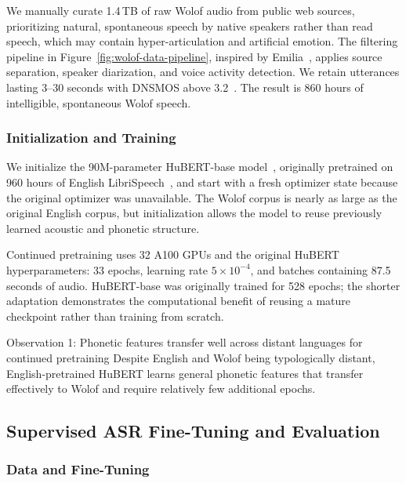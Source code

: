 We manually curate 1.4\,TB of raw Wolof audio from public web sources, prioritizing natural, spontaneous speech by native speakers rather than read speech, which may contain hyper-articulation and artificial emotion. The filtering pipeline in Figure~\ref{fig:wolof-data-pipeline}, inspired by Emilia~\citep{emilia,emilialarge,amphion}, applies source separation, speaker diarization, and voice activity detection. We retain utterances lasting 3--30 seconds with DNSMOS above 3.2~\citep{dnsmos}. The result is 860 hours of intelligible, spontaneous Wolof speech.

\subsubsection{Initialization and Training}

We initialize the 90M-parameter HuBERT-base model~\citep{hubert}, originally pretrained on 960 hours of English LibriSpeech~\citep{librispeech}, and start with a fresh optimizer state because the original optimizer was unavailable. The Wolof corpus is nearly as large as the original English corpus, but initialization allows the model to reuse previously learned acoustic and phonetic structure.

Continued pretraining uses 32 A100 GPUs and the original HuBERT hyperparameters: 33 epochs, learning rate \(5\times10^{-4}\), and batches containing 87.5 seconds of audio. HuBERT-base was originally trained for 528 epochs; the shorter adaptation demonstrates the computational benefit of reusing a mature checkpoint rather than training from scratch.

\begin{insightbox}{Observation 1: Phonetic features transfer well across distant languages for continued pretraining}
Despite English and Wolof being typologically distant, English-pretrained HuBERT learns general phonetic features that transfer effectively to Wolof and require relatively few additional epochs.
\end{insightbox}

\subsection{Supervised ASR Fine-Tuning and Evaluation}
\label{sec:wolof-asr}

\subsubsection{Data and Fine-Tuning}

